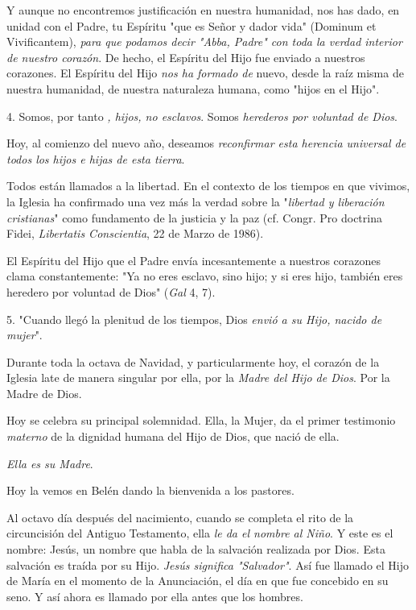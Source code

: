 \begin{body}
Y aunque no encontremos justificación en nuestra humanidad, nos has
dado, en unidad con el Padre, tu Espíritu "que es Señor y dador vida"
(Dominum et Vivificantem), \emph{para que podamos decir "Abba, Padre"
	con toda la verdad interior de nuestro corazón}. De hecho, el Espíritu
del Hijo fue enviado a nuestros corazones. El Espíritu del Hijo
\emph{nos ha formado de} nuevo, desde la raíz misma de nuestra
humanidad, de nuestra naturaleza humana, como "hijos en el Hijo".

4. Somos, por tanto \emph{, hijos, no esclavos}. Somos \emph{herederos
	por voluntad de Dios}.

Hoy, al comienzo del nuevo año, deseamos \emph{reconfirmar esta herencia
	universal de todos los hijos e hijas de esta tierra}.

Todos están llamados a la libertad. En el contexto de los tiempos en que
vivimos, la Iglesia ha confirmado una vez más la verdad sobre la
"\emph{libertad y liberación cristianas}" como fundamento de la justicia
y la paz (cf. Congr. Pro doctrina Fidei, \emph{Libertatis Conscientia},
22 de Marzo de 1986).

El Espíritu del Hijo que el Padre envía incesantemente a nuestros
corazones clama constantemente: "Ya no eres esclavo, sino hijo; y si
eres hijo, también eres heredero por voluntad de Dios" (\emph{Gal} 4,
7).

5. "Cuando llegó la plenitud de los tiempos, Dios \emph{envió a su Hijo,
	nacido de mujer}".

Durante toda la octava de Navidad, y particularmente hoy, el corazón de
la Iglesia late de manera singular por ella, por la \emph{Madre del Hijo
	de Dios}. Por la Madre de Dios.

Hoy se celebra su principal solemnidad. Ella, la Mujer, da el primer
testimonio \emph{materno} de la dignidad humana del Hijo de Dios, que
nació de ella.

\emph{Ella es su Madre}.

Hoy la vemos en Belén dando la bienvenida a los pastores.

Al octavo día después del nacimiento, cuando se completa el rito de la
circuncisión del Antiguo Testamento, ella \emph{le da el nombre al
	Niño}. Y este es el nombre: Jesús, un nombre que habla de la salvación
realizada por Dios. Esta salvación es traída por su Hijo. \emph{Jesús
	significa "Salvador"}. Así fue llamado el Hijo de María en el momento de
la Anunciación, el día en que fue concebido en su seno. Y así ahora es
llamado por ella antes que los hombres.


\end{body}
